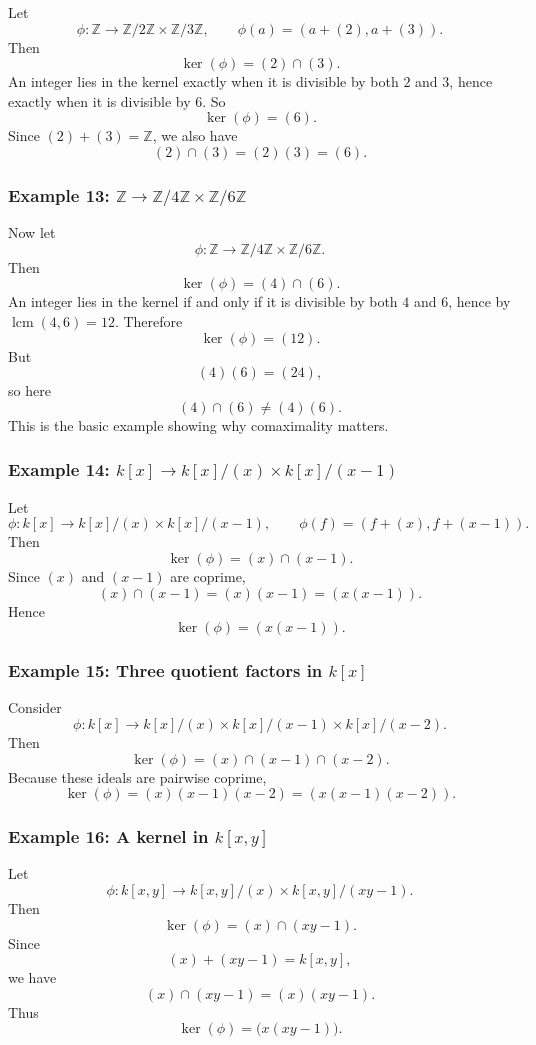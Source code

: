 \documentclass[12pt,a4paper]{article}
\theoremstyle{notespace}
\begin{document}
Let
\[
\phi:\mathbb Z\to \mathbb Z/2\mathbb Z\times \mathbb Z/3\mathbb Z,
\qquad
\phi(a)=(a+(2),a+(3)).
\]
Then
\[
\ker(\phi)=(2)\cap(3).
\]
An integer lies in the kernel exactly when it is divisible by both \(2\) and \(3\), hence exactly when it is divisible by \(6\). So
\[
\ker(\phi)=(6).
\]
Since \((2)+(3)=\mathbb Z\), we also have
\[
(2)\cap(3)=(2)(3)=(6).
\]

\subsubsection*{Example 13: \(\mathbb Z\to \mathbb Z/4\mathbb Z\times \mathbb Z/6\mathbb Z\)}

Now let
\[
\phi:\mathbb Z\to \mathbb Z/4\mathbb Z\times \mathbb Z/6\mathbb Z.
\]
Then
\[
\ker(\phi)=(4)\cap(6).
\]
An integer lies in the kernel if and only if it is divisible by both \(4\) and \(6\), hence by \(\operatorname{lcm}(4,6)=12\). Therefore
\[
\ker(\phi)=(12).
\]
But
\[
(4)(6)=(24),
\]
so here
\[
(4)\cap(6)\neq (4)(6).
\]
This is the basic example showing why comaximality matters.

\subsubsection*{Example 14: \(k[x]\to k[x]/(x)\times k[x]/(x-1)\)}

Let
\[
\phi:k[x]\to k[x]/(x)\times k[x]/(x-1),
\qquad
\phi(f)=(f+(x),f+(x-1)).
\]
Then
\[
\ker(\phi)=(x)\cap(x-1).
\]
Since \((x)\) and \((x-1)\) are coprime,
\[
(x)\cap(x-1)=(x)(x-1)=(x(x-1)).
\]
Hence
\[
\ker(\phi)=(x(x-1)).
\]

\subsubsection*{Example 15: Three quotient factors in \(k[x]\)}

Consider
\[
\phi:k[x]\to k[x]/(x)\times k[x]/(x-1)\times k[x]/(x-2).
\]
Then
\[
\ker(\phi)=(x)\cap(x-1)\cap(x-2).
\]
Because these ideals are pairwise coprime,
\[
\ker(\phi)=(x)(x-1)(x-2)=(x(x-1)(x-2)).
\]

\subsubsection*{Example 16: A kernel in \(k[x,y]\)}

Let
\[
\phi:k[x,y]\to k[x,y]/(x)\times k[x,y]/(xy-1).
\]
Then
\[
\ker(\phi)=(x)\cap(xy-1).
\]
Since
\[
(x)+(xy-1)=k[x,y],
\]
we have
\[
(x)\cap(xy-1)=(x)(xy-1).
\]
Thus
\[
\ker(\phi)=\big(x(xy-1)\big).
\]
\end{document}
